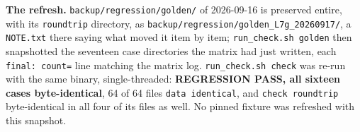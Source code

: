 \documentclass[english,a4paper]{my_memo}
\begin{document}
\textbf{The refresh.} \texttt{backup/regression/golden/} of 2026-09-16 is preserved entire,
with its \texttt{roundtrip} directory, as \texttt{backup/regression/golden\_L7g\_20260917/}, a
\texttt{NOTE.txt} there saying what moved it item by item; \texttt{run\_check.sh\ golden} then
snapshotted the seventeen case directories the matrix had just written, each
\texttt{final:\ count=} line matching the matrix log. \texttt{run\_check.sh\ check} was re-run
with the same binary, single-threaded: \textbf{REGRESSION PASS, all sixteen cases
byte-identical}, 64 of 64 files \texttt{data\ identical}, and \texttt{check\ roundtrip}
byte-identical in all four of its files as well. No pinned fixture was
refreshed with this snapshot.

\appendix

\end{document}
